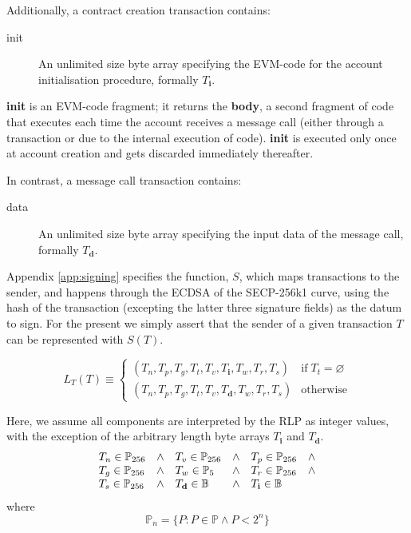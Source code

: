 \documentclass[9pt,oneside]{amsart}
\begin{document}
\begin{multicols}{2}
Additionally, a contract creation transaction contains:

\begin{description}
\item[init] An unlimited size byte array specifying the EVM-code for the account initialisation procedure, formally $T_\mathbf{i}$.
\end{description}

\textbf{init} is an EVM-code fragment; it returns the \textbf{body}, a second fragment of code that executes each time the account receives a message call (either through a transaction or due to the internal execution of code). \textbf{init} is executed only once at account creation and gets discarded immediately thereafter.

In contrast, a message call transaction contains:

\begin{description}
\item[data] An unlimited size byte array specifying the input data of the message call, formally $T_\mathbf{d}$.
\end{description}

Appendix \ref{app:signing} specifies the function, $S$, which maps transactions to the sender, and happens through the ECDSA of the SECP-256k1 curve, using the hash of the transaction (excepting the latter three signature fields) as the datum to sign. For the present we simply assert that the sender of a given transaction $T$ can be represented with $S(T)$.

\begin{equation}
L_T(T) \equiv \begin{cases}
(T_n, T_p, T_g, T_t, T_v, T_\mathbf{i}, T_w, T_r, T_s) & \text{if} \; T_t = \varnothing\\
(T_n, T_p, T_g, T_t, T_v, T_\mathbf{d}, T_w, T_r, T_s) & \text{otherwise}
\end{cases}
\end{equation}

Here, we assume all components are interpreted by the RLP as integer values, with the exception of the arbitrary length byte arrays $T_\mathbf{i}$ and $T_\mathbf{d}$.
\begin{equation}
\begin{array}[t]{lclclc}
T_n \in \mathbb{P}_{256} & \wedge & T_v \in \mathbb{P}_{256} & \wedge & T_p \in \mathbb{P}_{256} & \wedge \\
T_g \in \mathbb{P}_{256} & \wedge & T_w \in \mathbb{P}_5 & \wedge & T_r \in \mathbb{P}_{256} & \wedge \\
T_s \in \mathbb{P}_{256} & \wedge & T_\mathbf{d} \in \mathbb{B} & \wedge & T_\mathbf{i} \in \mathbb{B}
\end{array}
\end{equation}
where
\begin{equation}
\mathbb{P}_n = \{ P: P \in \mathbb{P} \wedge P < 2^n \}
\end{equation}


\end{multicols}
\end{document}
